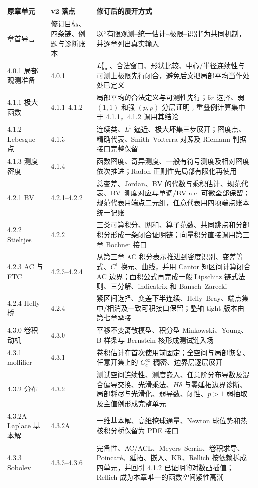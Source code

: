 \documentclass[11pt,a4paper]{ctexart}
\begin{document}
\begin{longtable}{p{}p{}p{}}
\toprule
原章单元 & v2 落点 & 修订后的展开方式\\
\midrule
章首导言 & 修订目标、四条链、例题与诊断账本 & 以“有限观测--统一估计--极限--识别”为共同机制，并逐章列出真实输入\\
4.0.1 局部观测准备 & 4.0.1 & $L^p_{\rm loc}$、合法窗口、形状比较、中心/半径连续性与可测上极限先行闭合，避免后文把局部平均当作处处已定义\\
4.1.1 极大函数 & 4.1.1--4.1.2 & 局部平均的合法定义与可测性先行；$5r$ 选择、弱 $(1,1)$ 和强 $(p,p)$ 分层证明；重叠例计算集中于 4.1.1，4.1.2 调用其结论\\
4.1.2 Lebesgue 点 & 4.1.3 & 连续类、$L^1$ 逼近、极大坏集三步展开；密度点、精确代表、Smith--Volterra 对照及 Riemann 判据接口完整保留\\
4.1.3 测度密度 & 4.1.4 & 函数密度、奇异测度、一般有符号测度及相对密度依次推进；Radon 正则性先局部有限化再使用\\
4.2.1 BV & 4.2.1--4.2.2 & 总变差、Jordan、BV 的代数与乘积估计、规范代表、BV--测度对应与单调/BV a.e. 可微全部保留；规范代表用端点二元组，任意代表用四项端点账本统一记账\\
4.2.2 Stieltjes & 4.2.2 & 三类可算积分、网和、算子范数、共同跳点和分部积分形成一条闭合证明链；向量积分直接调用第三章 Bochner 接口\\
4.2.3 AC 与 FTC & 4.2.3--4.2.4 & 从第三章 AC 积分表示推进到密度识别、变差等式、$C^1$ 换元、曲线，并用 Cantor 短区间计算闭合 AC 边界；面积公式再完成一般 Lipschitz 链式法则、三分解、indicatrix 和 Banach--Zarecki\\
4.2.4 Helly 桥 & 4.2.4 & 紧区间选择、变差下半连续、Helly--Bray、端点集中/相消及一致可积接口保留；整轴 tight 版本由第七章承接\\
4.3.0 卷积动机 & 4.3.0 & 平移不变离散模型、积分型 Minkowski、Young、B 样条与 Bernstein 核形成测试链入场\\
4.3.1 mollifier & 4.3.1 & 卷积估计在首次使用前固定；全空间与局部恢复、任意开集上的 $C_c^\infty$ 稠密、边界层逐层展开\\
4.3.2 分布 & 4.3.2 & 测试空间连续性、测度嵌入、任意阶分布导数及混合偏导交换、光滑乘法、$H\delta$ 与零延拓边界诊断、局部耗尽与光滑化、弱导数、闭性、$p>1$ 弱抽取及主值例形成完整单元\\
4.3.2A Laplace 基本解 & 4.3.2A & 一维基本解、高维挖球通量、Newton 球位势和热核积分桥保留为 PDE 接口\\
4.3.3 Sobolev & 4.3.3--4.3.6 & 完备性、AC/ACL、Meyers--Serrin、卷积求导、Poincar\'e、延拓、嵌入、KR、Rellich 按依赖拆成四单元，并回引 4.1.2 已证明的对数凸插值；Rellich 成为本章唯一的函数空间紧性高潮\\

\end{longtable}
\end{document}
